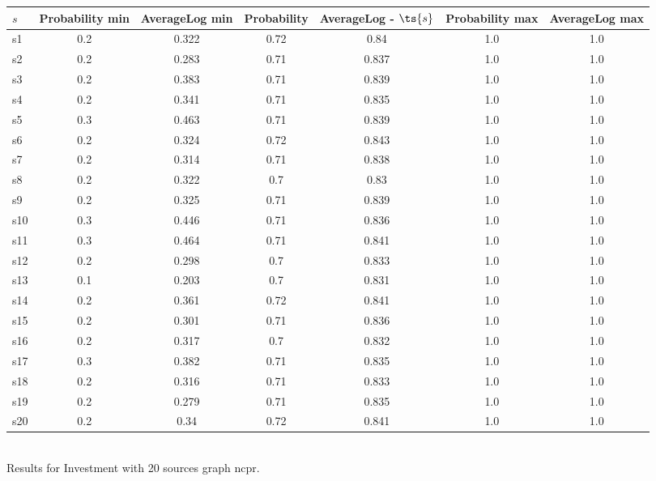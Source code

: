 \documentclass{article}
\begin{document}
\noindent\begin{tabular}{|l|c|c|c|c|c|c|}
\hline
$s$& Probability min & AverageLog min & Probability & AverageLog - $\ts{s}$ & Probability max & AverageLog max\\
\hline
s1 &0.2 & 0.322 & 0.72 & 0.84 & 1.0 & 1.0\\
\hline
s2 &0.2 & 0.283 & 0.71 & 0.837 & 1.0 & 1.0\\
\hline
s3 &0.2 & 0.383 & 0.71 & 0.839 & 1.0 & 1.0\\
\hline
s4 &0.2 & 0.341 & 0.71 & 0.835 & 1.0 & 1.0\\
\hline
s5 &0.3 & 0.463 & 0.71 & 0.839 & 1.0 & 1.0\\
\hline
s6 &0.2 & 0.324 & 0.72 & 0.843 & 1.0 & 1.0\\
\hline
s7 &0.2 & 0.314 & 0.71 & 0.838 & 1.0 & 1.0\\
\hline
s8 &0.2 & 0.322 & 0.7 & 0.83 & 1.0 & 1.0\\
\hline
s9 &0.2 & 0.325 & 0.71 & 0.839 & 1.0 & 1.0\\
\hline
s10 &0.3 & 0.446 & 0.71 & 0.836 & 1.0 & 1.0\\
\hline
s11 &0.3 & 0.464 & 0.71 & 0.841 & 1.0 & 1.0\\
\hline
s12 &0.2 & 0.298 & 0.7 & 0.833 & 1.0 & 1.0\\
\hline
s13 &0.1 & 0.203 & 0.7 & 0.831 & 1.0 & 1.0\\
\hline
s14 &0.2 & 0.361 & 0.72 & 0.841 & 1.0 & 1.0\\
\hline
s15 &0.2 & 0.301 & 0.71 & 0.836 & 1.0 & 1.0\\
\hline
s16 &0.2 & 0.317 & 0.7 & 0.832 & 1.0 & 1.0\\
\hline
s17 &0.3 & 0.382 & 0.71 & 0.835 & 1.0 & 1.0\\
\hline
s18 &0.2 & 0.316 & 0.71 & 0.833 & 1.0 & 1.0\\
\hline
s19 &0.2 & 0.279 & 0.71 & 0.835 & 1.0 & 1.0\\
\hline
s20 &0.2 & 0.34 & 0.72 & 0.841 & 1.0 & 1.0\\
\hline
\end{tabular}\\

\noindent Results for Investment with 20 sources graph ncpr.
\end{document}
